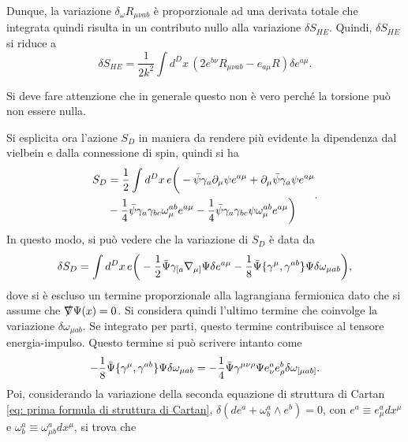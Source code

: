 Dunque, la variazione $\delta_\omega R_{\mu\nu ab}$ è proporzionale ad una derivata totale che integrata quindi risulta in un contributo nullo alla variazione $\delta S_{HE}$. Quindi, $\delta S_{HE}$ si riduce a
\begin{equation}
\label{eq: variazione azione H-E per vielbein (formalismo II ordine)}
    \delta S_{HE} = \frac{1}{2k^2}\int d^Dx\,(2e^{b\nu}R_{\mu\nu ab} - e_{a\mu}R)\delta e^{a\mu}.
\end{equation}
\begin{obs}
    Si deve fare attenzione che in generale questo non è vero perché la torsione può non essere nulla.
\end{obs}
Si esplicita ora l'azione $S_D$ in maniera da rendere più evidente la dipendenza dal vielbein e dalla connessione di spin, quindi si ha
\begin{equation}
    \begin{split}
        S_D &= \frac{1}{2}\int d^Dx\,e\bigg(-\b{\psi}\gamma_a\p_\mu\psi e^{a\mu} + \p_\mu\b{\psi}\gamma_a\psi e^{a\mu} \\
        &-\frac{1}{4}\b{\psi}\gamma_a\gamma_{bc}\omega_\mu^{ab}e^{a\mu} - \frac{1}{4}\b{\psi}\gamma_a\gamma_{bc}\psi\omega_\mu^{ab}e^{a\mu}\bigg)
    \end{split}.
\end{equation}
In questo modo, si può vedere che la variazione di $S_D$ è data da 
\begin{equation}
    \delta S_D = \int d^Dx\,e\bigg(-\frac{1}{2}\b{\Psi}\gamma_{[a}\nabla_{\mu]}\Psi\delta e^{a\mu} - \frac{1}{8}\b{\Psi}\acomm{\gamma^\mu}{\gamma^{ab}}\Psi\delta\omega_{\mu ab}\bigg),
\end{equation}
dove si è escluso un termine proporzionale alla lagrangiana fermionica dato che si assume che $\sl{\nabla}\Psi(x) = 0$. Si considera quindi l'ultimo termine che coinvolge la variazione $\delta\omega_{\mu ab}$. Se integrato per parti, questo termine contribuisce al tensore energia-impulso. Questo termine si può scrivere intanto come 
\begin{equation}
    -\frac{1}{8}\b{\Psi}\acomm{\gamma^\mu}{\gamma^{ab}}\Psi\delta\omega_{\mu ab} = -\frac{1}{4}\b{\Psi}\gamma^{\mu\nu\rho}\Psi e^a_\nu e^b_\rho\delta\omega_{[\mu ab]}.
\end{equation}
Poi, considerando la variazione della seconda equazione di struttura di Cartan \eqref{eq: prima formula di struttura di Cartan}, $\delta(de^a + \omega_b^a \wedge e^b) = 0$, con $e^a \equiv e^a_\mu dx^\mu$ e $\omega^a_b \equiv \omega^a_{\mu b}dx^\mu$, si trova che 
